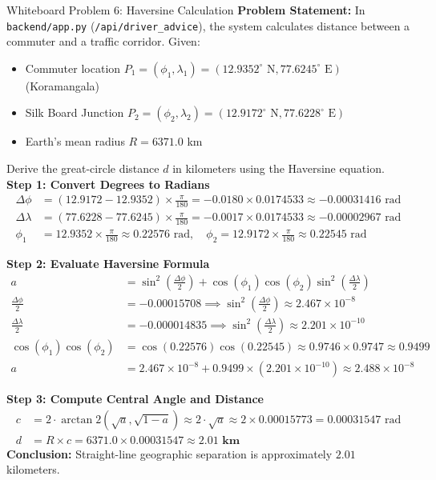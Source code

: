 \documentclass[11pt,a4paper,oneside]{report}
\begin{document}
\begin{interviewq}{Whiteboard Problem 6: Haversine Calculation}
\textbf{Problem Statement:}
In \texttt{backend/app.py} (\texttt{/api/driver\_advice}), the system calculates distance between a commuter and a traffic corridor. Given:
\begin{itemize}
    \item Commuter location $P_1 = (\phi_1, \lambda_1) = (12.9352^\circ\text{ N}, 77.6245^\circ\text{ E})$ (Koramangala)
    \item Silk Board Junction $P_2 = (\phi_2, \lambda_2) = (12.9172^\circ\text{ N}, 77.6228^\circ\text{ E})$
    \item Earth's mean radius $R = 6371.0$ km
\end{itemize}
Derive the great-circle distance $d$ in kilometers using the Haversine equation.
\tcblower
\textbf{Step 1: Convert Degrees to Radians}
\begin{align*}
\Delta \phi &= (12.9172 - 12.9352) \times \frac{\pi}{180} = -0.0180 \times 0.0174533 \approx -0.00031416 \text{ rad} \\
\Delta \lambda &= (77.6228 - 77.6245) \times \frac{\pi}{180} = -0.0017 \times 0.0174533 \approx -0.00002967 \text{ rad} \\
\phi_1 &= 12.9352 \times \frac{\pi}{180} \approx 0.22576 \text{ rad}, \quad \phi_2 = 12.9172 \times \frac{\pi}{180} \approx 0.22545 \text{ rad}
\end{align*}

\textbf{Step 2: Evaluate Haversine Formula}
\begin{align*}
a &= \sin^2\left(\frac{\Delta \phi}{2}\right) + \cos(\phi_1)\cos(\phi_2)\sin^2\left(\frac{\Delta \lambda}{2}\right) \\
\frac{\Delta \phi}{2} &= -0.00015708 \implies \sin^2\left(\frac{\Delta \phi}{2}\right) \approx 2.467 \times 10^{-8} \\
\frac{\Delta \lambda}{2} &= -0.000014835 \implies \sin^2\left(\frac{\Delta \lambda}{2}\right) \approx 2.201 \times 10^{-10} \\
\cos(\phi_1)\cos(\phi_2) &= \cos(0.22576)\cos(0.22545) \approx 0.9746 \times 0.9747 \approx 0.9499 \\
a &= 2.467 \times 10^{-8} + 0.9499 \times (2.201 \times 10^{-10}) \approx 2.488 \times 10^{-8}
\end{align*}

\textbf{Step 3: Compute Central Angle and Distance}
\begin{align*}
c &= 2 \cdot \arctan2(\sqrt{a}, \sqrt{1 - a}) \approx 2 \cdot \sqrt{a} \approx 2 \times 0.00015773 = 0.00031547 \text{ rad} \\
d &= R \times c = 6371.0 \times 0.00031547 \approx \mathbf{2.01 \text{ km}}
\end{align*}
\textbf{Conclusion:} Straight-line geographic separation is approximately $2.01$ kilometers.
\end{interviewq}
\end{document}
